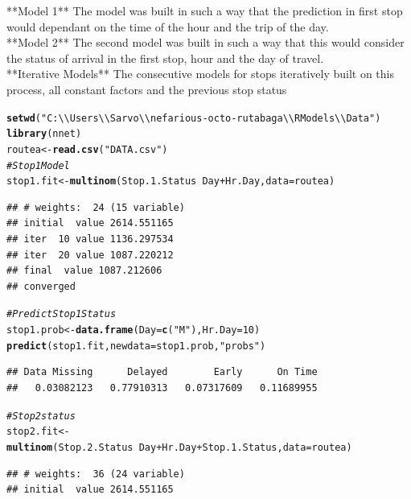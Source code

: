 \documentclass[12pt]{article}\usepackage[]{graphicx}\usepackage[]{color}
\makeatletter
\newcommand{\hlnum}[1]{\textcolor[rgb]{0.686,0.059,0.569}{#1}}%
\newcommand{\hlstr}[1]{\textcolor[rgb]{0.192,0.494,0.8}{#1}}%
\newcommand{\hlcom}[1]{\textcolor[rgb]{0.678,0.584,0.686}{\textit{#1}}}%
\newcommand{\hlopt}[1]{\textcolor[rgb]{0,0,0}{#1}}%
\newcommand{\hlstd}[1]{\textcolor[rgb]{0.345,0.345,0.345}{#1}}%
\newcommand{\hlkwb}[1]{\textcolor[rgb]{0.69,0.353,0.396}{#1}}%
\newcommand{\hlkwc}[1]{\textcolor[rgb]{0.333,0.667,0.333}{#1}}%
\newcommand{\hlkwd}[1]{\textcolor[rgb]{0.737,0.353,0.396}{\textbf{#1}}}%
\newenvironment{kframe}{%
 \def\at@end@of@kframe{}%
 \ifinner\ifhmode%
  \def\at@end@of@kframe{\end{minipage}}%
  \begin{minipage}{\columnwidth}%
 \fi\fi%
 \def\FrameCommand##1{\hskip\@totalleftmargin \hskip-\fboxsep
 \colorbox{shadecolor}{##1}\hskip-\fboxsep
     \hskip-\linewidth \hskip-\@totalleftmargin \hskip\columnwidth}%
 \MakeFramed {\advance\hsize-\width
   \@totalleftmargin\z@ \linewidth\hsize
   \@setminipage}}%
 {\par\unskip\endMakeFramed%
 \at@end@of@kframe}
\newenvironment{knitrout}{}{} %
\makeatother
\begin{document}
**Model 1** The model was built in such a way that the prediction in first stop would dependant on the time of the hour and the trip of the day.\\
**Model 2** The second model was built in such a way that this would consider the status of arrival in the first stop, hour and the day of travel.\\
**Iterative Models** The consecutive models for stops iteratively built on this process, all constant factors and the previous stop status
\begin{knitrout}
\color{fgcolor}\begin{kframe}
\begin{alltt}
\hlkwd{setwd}\hlstd{(}\hlstr{"C:\textbackslash{}\textbackslash{}Users\textbackslash{}\textbackslash{}Sarvo\textbackslash{}\textbackslash{}nefarious-octo-rutabaga\textbackslash{}\textbackslash{}R Models\textbackslash{}\textbackslash{}Data"}\hlstd{)}
\hlkwd{library}\hlstd{(nnet)}
\hlstd{routea}\hlkwb{<-}\hlkwd{read.csv}\hlstd{(}\hlstr{"DATA.csv"}\hlstd{)}
\hlcom{# Stop 1 Model}
\hlstd{stop1.fit}\hlkwb{<-}\hlkwd{multinom}\hlstd{(Stop.1.Status}\hlopt{~}\hlstd{Day}\hlopt{+}\hlstd{Hr.Day,}\hlkwc{data}\hlstd{=routea)}
\end{alltt}
\begin{verbatim}
## # weights:  24 (15 variable)
## initial  value 2614.551165 
## iter  10 value 1136.297534
## iter  20 value 1087.220212
## final  value 1087.212606 
## converged
\end{verbatim}
\begin{alltt}
\hlcom{# Predict Stop 1 Status}
\hlstd{stop1.prob}\hlkwb{<-}\hlkwd{data.frame}\hlstd{(}\hlkwc{Day}\hlstd{=}\hlkwd{c}\hlstd{(}\hlstr{"M"}\hlstd{),}\hlkwc{Hr.Day}\hlstd{=}\hlnum{10}\hlstd{)}
\hlkwd{predict}\hlstd{(stop1.fit,}\hlkwc{newdata} \hlstd{= stop1.prob,}\hlstr{"probs"}\hlstd{)}
\end{alltt}
\begin{verbatim}
## Data Missing      Delayed        Early      On Time 
##   0.03082123   0.77910313   0.07317609   0.11689955
\end{verbatim}
\begin{alltt}
\hlcom{#Stop 2 status}
\hlstd{stop2.fit}\hlkwb{<-}\hlkwd{multinom}\hlstd{(Stop.2.Status}\hlopt{~}\hlstd{Day}\hlopt{+}\hlstd{Hr.Day}\hlopt{+}\hlstd{Stop.1.Status,}\hlkwc{data}\hlstd{=routea)}
\end{alltt}
\begin{verbatim}
## # weights:  36 (24 variable)
## initial  value 2614.551165 

\end{verbatim}
\end{kframe}
\end{knitrout}
\end{document}
